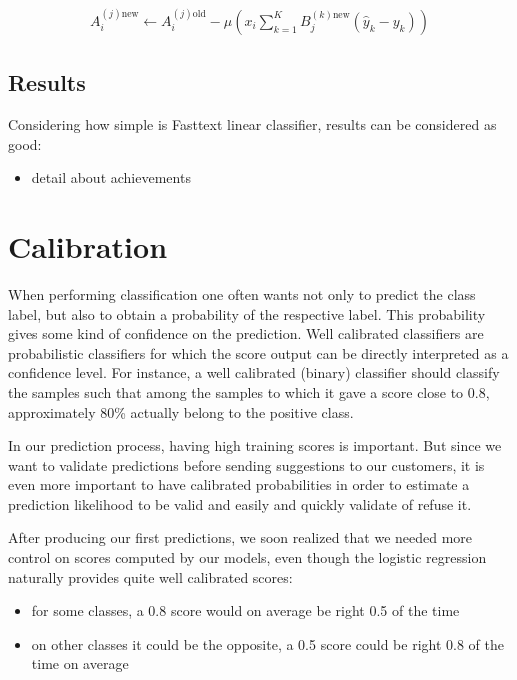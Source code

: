 \begin{align}
	A_i^{(j)\mbox{new}} \leftarrow A_i^{(j)\mbox{old}} - 
	\mu 
	\left(
		x_i \sum_{k=1}^K B_j^{(k)\mbox{new}} (\hat y_k - y_k) 
	\right)
\end{align}

\subsection{Results}

Considering how simple is Fasttext linear classifier, results can be considered as good:
\begin{itemize}
	\item detail about achievements
\end{itemize}





\pagebreak
\section{Calibration}

When performing classification one often wants not only to predict the class label, but also to obtain a probability of the respective label. This probability gives some kind of confidence on the prediction.
Well calibrated classifiers are probabilistic classifiers for which the score output can be directly interpreted as a confidence level. For instance, a well calibrated (binary) classifier should classify the samples such that among the samples to which it gave a score close to 0.8, approximately 80\% actually belong to the positive class.

In our prediction process, having high training scores is important. But since we want to validate predictions before sending suggestions to our customers, it is even more important to have calibrated probabilities in order to estimate a prediction likelihood to be valid and easily and quickly validate of refuse it.

After producing our first predictions, we soon realized that we needed more control on scores computed by our models, even though the logistic regression naturally provides quite well calibrated scores:
\begin{itemize}
	\item for some classes, a 0.8 score would on average be right 0.5 of the time
	\item on other classes it could be the opposite, a 0.5 score could be right 0.8 of the time on average
\end{itemize}

